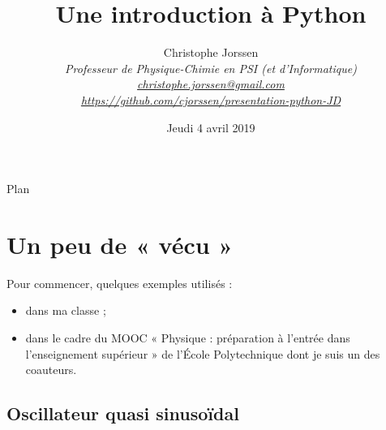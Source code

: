 \documentclass[10pt,aspectratio=169]{beamer}
\title{Une introduction à Python}
\institute[]{Lycée Jacques Decour -- Paris}
\author[C. Jorssen]{%
  Christophe Jorssen\\
  \color{GoogleGreen}\itshape\small Professeur de Physique-Chimie en PSI (et d'Informatique)\\[5pt]
  \color{GoogleRed}\normalfont\footnotesize\href{mailto:christophe.jorssen@gmail.com}{christophe.jorssen@gmail.com} \\
  \color{GoogleYellow}\footnotesize\url{https://github.com/cjorssen/presentation-python-JD}}
\date{Jeudi 4 avril 2019}
\begin{document}
\begin{frame}
  \titlepage
\end{frame}

\begin{frame}
  \doclicenseThis
\end{frame}

\begin{frame}
\end{frame}

\begin{frame}{Plan}
  \tableofcontents[hideallsubsections]
\end{frame}

\section{Un peu de « vécu »}

\begin{frame}
  \begin{Card}
    Pour commencer, quelques exemples utilisés :
    \begin{itemize}
    \item dans ma classe ;
    \item dans le cadre du MOOC « Physique : préparation à l'entrée dans l'enseignement supérieur » de l'École Polytechnique dont je suis un des coauteurs.
    \end{itemize}
  \end{Card}
\end{frame}

\subsection{Oscillateur quasi sinusoïdal}
\end{document}
